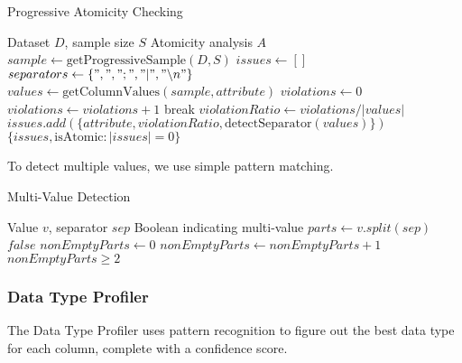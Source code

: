 \documentclass[sigconf]{acmart}
\begin{document}
\begin{algorithm}
\caption{Progressive Atomicity Checking}
\label{alg:atomicity-check}
\begin{algorithmic}[1]
\REQUIRE Dataset $D$, sample size $S$
\ENSURE Atomicity analysis $A$
\STATE $sample \leftarrow \text{getProgressiveSample}(D, S)$
\STATE $issues \leftarrow []$
\STATE $separators \leftarrow \{",", ";", "|", "\backslash n"\}$
    \STATE $values \leftarrow 
    \text{getColumnValues}(sample, attribute)$
    \STATE $violations \leftarrow 0$
                \STATE $violations \leftarrow violations + 1$
                \STATE break
            \ENDIF
        \ENDFOR
    \ENDFOR
    \STATE $violationRatio \leftarrow violations / |values|$
        \STATE $issues.add(\{attribute, violationRatio, \text{detectSeparator}(values)\})$
    \ENDIF
\ENDFOR
\STATE \RETURN $\{issues, \text{isAtomic}: |issues| = 0\}$
\end{algorithmic}
\end{algorithm}

To detect multiple values, we use simple pattern matching.

\begin{algorithm}
\caption{Multi-Value Detection}
\label{alg:multi-value-detect}
\begin{algorithmic}[1]
\REQUIRE Value $v$, separator $sep$
\ENSURE Boolean indicating multi-value
\STATE $parts \leftarrow v.split(sep)$
    \STATE \RETURN $false$
\ENDIF
\STATE $nonEmptyParts \leftarrow 0$
        \STATE $nonEmptyParts \leftarrow nonEmptyParts + 1$
    \ENDIF
\ENDFOR
\STATE \RETURN $nonEmptyParts \geq 2$
\end{algorithmic}
\end{algorithm}

\subsubsection{Data Type Profiler}

The Data Type Profiler uses pattern recognition to figure out the best data type for each column, complete with a confidence score.
\end{document}
